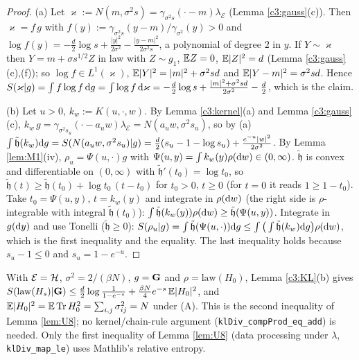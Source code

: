 \begin{proof}
(a) Let $\varkappa:=N(m,\sigma^2s)=\gamma_{\sigma^2s}(\cdot-m)\lambda_{\mathcal E}$ (Lemma \ref{c3:gauss}(c)). Then $\varkappa=f\,g$ with $f(y):=\gamma_{\sigma^2s}(y-m)/\gamma_{\sigma^2}(y)>0$ and
$\log f(y)=-\frac d2\log s+\frac{|y|^2}{2\sigma^2}-\frac{|y-m|^2}{2\sigma^2s}$, a polynomial of degree $2$ in $y$. If $Y\sim\varkappa$ then $Y=m+\sigma s^{1/2}Z$ in law with $Z\sim g_1$, $\mathbb{E} Z=0$, $\mathbb{E}|Z|^2=d$ (Lemma \ref{c3:gauss}(c),(f)); so $\log f\in L^1(\varkappa)$, $\mathbb{E}|Y|^2=|m|^2+\sigma^2sd$ and $\mathbb{E}|Y-m|^2=\sigma^2sd$. Hence
$S(\varkappa|g)=\int f\log f\,\mathrm{d} g=\int\log f\,\mathrm{d}\varkappa=-\frac d2\log s+\frac{|m|^2+\sigma^2sd}{2\sigma^2}-\frac d2$, which is the claim.

(b) Let $u>0$, $k_w:=K(u,\cdot,w)$. By Lemma \ref{c3:kernel}(a) and Lemma \ref{c3:gauss}(c), $k_w\,g=\gamma_{\sigma^2s_u}(\cdot-a_uw)\lambda_{\mathcal E}=N(a_uw,\sigma^2s_u)$, so by (a)
$\int\tilde{\mathfrak h}(k_w)\mathrm{d} g=S(N(a_uw,\sigma^2s_u)|g)=\frac d2(s_u-1-\log s_u)+\frac{e^{-u}|w|^2}{2\sigma^2}$.
By Lemma \ref{lem:M1}(iv), $\rho_u=\Psi(u,\cdot)g$ with $\Psi(u,y)=\int k_w(y)\rho(\mathrm{d} w)\in(0,\infty)$.
$\tilde{\mathfrak h}$ is convex and differentiable on $(0,\infty)$ with $\tilde{\mathfrak h}'(t_0)=\log t_0$, so $\tilde{\mathfrak h}(t)\ge\tilde{\mathfrak h}(t_0)+\log t_0\,(t-t_0)$ for $t_0>0$, $t\ge0$ (for $t=0$ it reads $1\ge1-t_0$).
Take $t_0=\Psi(u,y)$, $t=k_w(y)$ and integrate in $\rho(\mathrm{d} w)$ (the right side is $\rho$-integrable with integral $\tilde{\mathfrak h}(t_0)$): $\int\tilde{\mathfrak h}(k_w(y))\rho(\mathrm{d} w)\ge\tilde{\mathfrak h}(\Psi(u,y))$.
Integrate in $g(\mathrm{d} y)$ and use Tonelli ($\tilde{\mathfrak h}\ge0$):
$S(\rho_u|g)=\int\tilde{\mathfrak h}(\Psi(u,\cdot))\mathrm{d} g\le\int\big(\int\tilde{\mathfrak h}(k_w)\mathrm{d} g\big)\rho(\mathrm{d} w)$, which is the first inequality and the equality. The last inequality holds because $s_u-1\le0$ and $s_u=1-e^{-u}$.
\end{proof}

\begin{auxremark}\label{c3:rem:U8}
With $\mathcal E=\mathcal{H}$, $\sigma^2=2/(\beta N)$, $g=\mathbf{G}$ and $\rho=\mathrm{law}(H_0)$, Lemma \ref{c3:KL}(b) gives $S(\mathrm{law}(H_s)|\mathbf{G})\le\frac d2\log\frac1{1-e^{-s}}+\frac{\beta N}{4}e^{-s}\,\mathbb{E}|H_0|^2$, and $\mathbb{E}|H_0|^2=\mathbb{E}\operatorname{Tr} H_0^2=\sum_{i,j}\sigma_{ij}^2=N$ under (A). This is the second inequality of Lemma \ref{lem:U8}; no kernel/chain-rule argument (\texttt{klDiv\_compProd\_eq\_add}) is needed. Only the first inequality of Lemma \ref{lem:U8} (data processing under $\lambda$, \texttt{klDiv\_map\_le}) uses Mathlib's relative entropy.
\end{auxremark}

